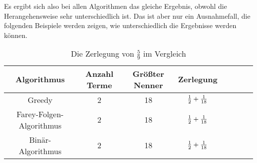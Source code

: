 \begin{bsp}
	Es ergibt sich also bei allen Algorithmen das gleiche Ergebnis, obwohl die Herangehensweise sehr unterschiedlich ist. Das ist aber nur ein Ausnahmefall, die folgenden Beispiele werden zeigen, wie unterschiedlich die Ergebnisse werden können.
	
	\vspace{0.5cm}
	\begin{table}[H]
		\centering
		\begin{tabular}{|Sc | Sc | Sc | Sc|}
			\hline
			Algorithmus & Anzahl Terme & Größter Nenner & Zerlegung \\ \hline
			Greedy & 2 & 18 & $\frac{1}{2}+\frac{1}{18}$ \\ \hline
			Farey-Folgen-Algorithmus & 2 & 18 & $\frac{1}{2}+\frac{1}{18}$ \\ \hline
			Binär-Algorithmus & 2 & 18 & $\frac{1}{2}+\frac{1}{18}$ \\ \hline
		\end{tabular}
		\caption{Die Zerlegung von $\frac{5}{9}$ im Vergleich}
		\label{table:vgl5/9}
	\end{table}
\end{bsp}


